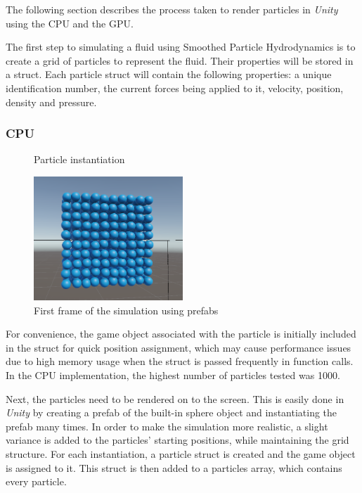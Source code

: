 \documentclass[12pt]{article}
\newcommand{\wideimage}[2][]{%
  \makebox[\textwidth][c]{\texttt{[image: \#2]}}%
}
\begin{document}
    The following section describes the process taken to render particles in \textit{Unity} using the CPU and the GPU.

    The first step to simulating a fluid using Smoothed Particle Hydrodynamics is to create a grid of particles to represent the fluid. Their properties will be stored in a struct. Each particle struct will contain the following properties: a unique identification number, the current forces being applied to it, velocity, position, density and pressure.

    \subsubsection{CPU}

    \begin{figure}[H]
        \wideimage[width=1.1\textwidth]{spawnParticles.png}
        \caption{Particle instantiation}
    \end{figure}

    \begin{figure}[H]
        \begin{center}
            \includegraphics[width=0.5\textwidth]{firstFrameCPU.png}
            \caption{First frame of the simulation using prefabs}
        \end{center}
    \end{figure}

    For convenience, the game object associated with the particle is initially included in the struct for quick position assignment, which may cause performance issues due to high memory usage when the struct is passed frequently in function calls. In the CPU implementation, the highest number of particles tested was 1000.
    
    Next, the particles need to be rendered on to the screen. This is easily done in \textit{Unity} by creating a prefab of the built-in sphere object and instantiating the prefab many times. In order to make the simulation more realistic, a slight variance is added to the particles' starting positions, while maintaining the grid structure. For each instantiation, a particle struct is created and the game object is assigned to it. This struct is then added to a particles array, which contains every particle.
\end{document}
